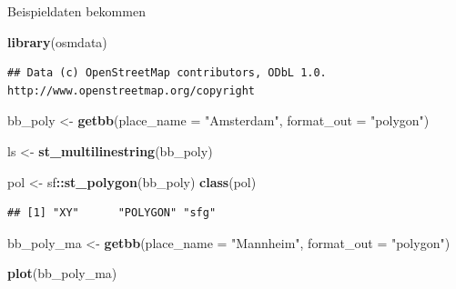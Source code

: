 \documentclass[ignorenonframetext,]{beamer}
\newenvironment{Shaded}{\begin{snugshade}}{\end{snugshade}}
\newcommand{\KeywordTok}[1]{\textcolor[rgb]{0.13,0.29,0.53}{\textbf{#1}}}
\newcommand{\DataTypeTok}[1]{\textcolor[rgb]{0.13,0.29,0.53}{#1}}
\newcommand{\StringTok}[1]{\textcolor[rgb]{0.31,0.60,0.02}{#1}}
\newcommand{\OperatorTok}[1]{\textcolor[rgb]{0.81,0.36,0.00}{\textbf{#1}}}
\newcommand{\NormalTok}[1]{#1}
\begin{document}
\begin{frame}[fragile]{Beispieldaten bekommen}

\begin{Shaded}
\begin{Highlighting}[]
\KeywordTok{library}\NormalTok{(osmdata)}
\end{Highlighting}
\end{Shaded}

\begin{verbatim}
## Data (c) OpenStreetMap contributors, ODbL 1.0. http://www.openstreetmap.org/copyright
\end{verbatim}

\begin{Shaded}
\begin{Highlighting}[]
\NormalTok{bb_poly <-}\StringTok{ }\KeywordTok{getbb}\NormalTok{(}\DataTypeTok{place_name =} \StringTok{"Amsterdam"}\NormalTok{, }
                 \DataTypeTok{format_out =} \StringTok{"polygon"}\NormalTok{)}
\end{Highlighting}
\end{Shaded}

\begin{Shaded}
\begin{Highlighting}[]
\NormalTok{ls <-}\StringTok{ }\KeywordTok{st_multilinestring}\NormalTok{(bb_poly)}
\end{Highlighting}
\end{Shaded}

\begin{Shaded}
\begin{Highlighting}[]
\NormalTok{pol <-}\StringTok{ }\NormalTok{sf}\OperatorTok{::}\KeywordTok{st_polygon}\NormalTok{(bb_poly)}
\KeywordTok{class}\NormalTok{(pol)}
\end{Highlighting}
\end{Shaded}

\begin{verbatim}
## [1] "XY"      "POLYGON" "sfg"
\end{verbatim}

\begin{Shaded}
\begin{Highlighting}[]
\NormalTok{bb_poly_ma <-}\StringTok{ }\KeywordTok{getbb}\NormalTok{(}\DataTypeTok{place_name =} \StringTok{"Mannheim"}\NormalTok{, }
                 \DataTypeTok{format_out =} \StringTok{"polygon"}\NormalTok{)}

\KeywordTok{plot}\NormalTok{(bb_poly_ma)}
\end{Highlighting}
\end{Shaded}


\end{frame}
\end{document}
